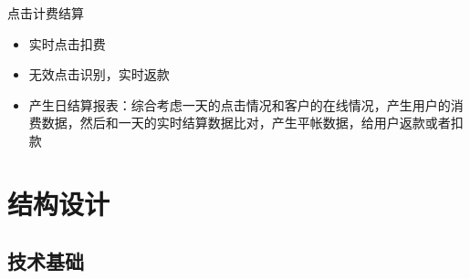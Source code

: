 \documentclass{beamer}
\begin{document}
\begin{CJK}{UTF8}{gbsn}
\begin{frame}{点击计费结算}
  \begin{itemize}
  \item {
    实时点击扣费
  }
  \item {
    无效点击识别，实时返款
  }
  \item {
    产生日结算报表：综合考虑一天的点击情况和客户的在线情况，产生用户的消费数据，然后和一天的实时结算数据比对，产生平帐数据，给用户返款或者扣款
  }
  \end{itemize}
\end{frame}



\section{结构设计}

\subsection{技术基础}


\end{CJK}
\end{document}
